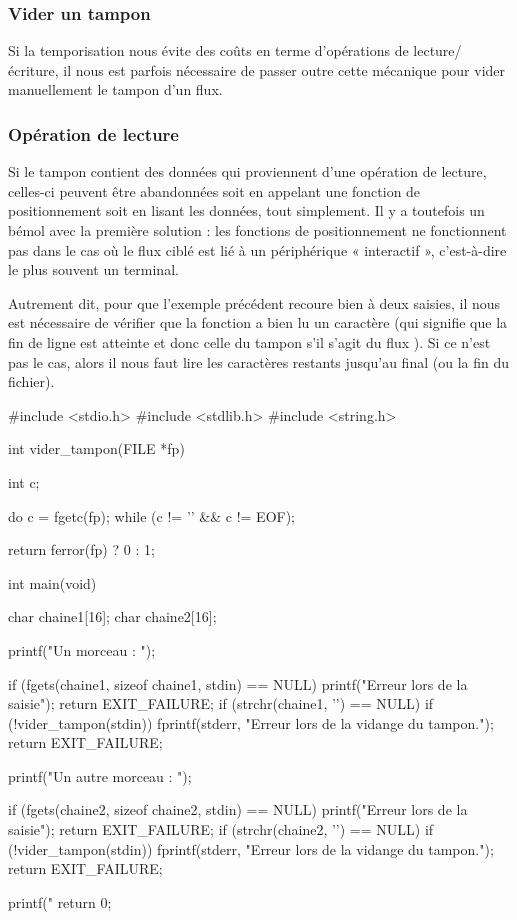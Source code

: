 \subsubsection{Vider un tampon}
\label{vider-un-tampon}

Si la temporisation nous évite des coûts en terme d'opérations de
lecture/écriture, il nous est parfois nécessaire de passer outre cette
mécanique pour vider manuellement le tampon d'un flux.

\subsubsection{Opération de lecture}
\label{operation-de-lecture}

Si le tampon contient des données qui proviennent d'une opération de
lecture, celles-ci peuvent être abandonnées soit en appelant une
fonction de positionnement soit en lisant les données, tout simplement.
Il y a toutefois un bémol avec la première solution : les fonctions de
positionnement ne fonctionnent pas dans le cas où le flux ciblé est lié
à un périphérique « interactif », c'est-à-dire le plus souvent un
terminal.

Autrement dit, pour que l'exemple précédent recoure bien à deux saisies,
il nous est nécessaire de vérifier que la fonction  a
bien lu un caractère  (qui signifie que la fin
de ligne est atteinte et donc celle du tampon s'il s'agit du flux
). Si ce n'est pas le cas, alors il nous faut lire les
caractères restants jusqu'au  final (ou la fin
du fichier).

\begin{C}
#include <stdio.h>
#include <stdlib.h>
#include <string.h>


int vider_tampon(FILE *fp)
{
    int c;

    do
        c = fgetc(fp);
    while (c != '\n' && c != EOF);

    return ferror(fp) ? 0 : 1;
}


int main(void)
{
    char chaine1[16];
    char chaine2[16];

    printf("Un morceau : ");

    if (fgets(chaine1, sizeof chaine1, stdin) == NULL)
    {
        printf("Erreur lors de la saisie\n");
        return EXIT_FAILURE;
    }
    if (strchr(chaine1, '\n') == NULL)
        if (!vider_tampon(stdin))
        {
            fprintf(stderr, "Erreur lors de la vidange du tampon.\n");
            return EXIT_FAILURE;
        }

    printf("Un autre morceau : ");

    if (fgets(chaine2, sizeof chaine2, stdin) == NULL)
    {
        printf("Erreur lors de la saisie\n");
        return EXIT_FAILURE;
    }
    if (strchr(chaine2, '\n') == NULL)
        if (!vider_tampon(stdin))
        {
            fprintf(stderr, "Erreur lors de la vidange du tampon.\n");
            return EXIT_FAILURE;
        }

    printf("%
    return 0;
}
\end{C}

